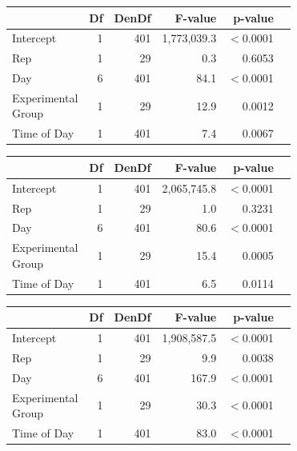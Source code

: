 \documentclass[a4paper, 10pt, titlepage]{article}
\begin{document}
\begin{table}[!htb]
\centering
{} 
\begin{tabular}{lrrrrr}
  \hline
 & Df & DenDf & F-value & p-value \\ 
  \hline
  Intercept & 1 & 401 & 1,773,039.3 & $<$0.0001\\
  Rep & 1 & 29 & 0.3 & 0.6053\\ 
  Day & 6 & 401 & 84.1 & $<$0.0001\\
  \makecell{Experimental \\ Group} & 1 & 29 & 12.9 & 0.0012\\
  Time of Day & 1 & 401 & 7.4 & 0.0067\\
   \hline
\end{tabular}
\end{table}

\begin{table}[!htb]
\centering
{} 
\begin{tabular}{lrrrrr}
  \hline
 & Df & DenDf & F-value & p-value \\ 
  \hline
  Intercept & 1 & 401 & 2,065,745.8 & $<$0.0001\\
  Rep & 1 & 29 & 1.0 & 0.3231\\ 
  Day & 6 & 401 & 80.6 & $<$0.0001\\
  \makecell{Experimental \\ Group} & 1 & 29 & 15.4 & 0.0005\\
  Time of Day & 1 & 401 & 6.5 & 0.0114\\
   \hline
\end{tabular}
\end{table}

\begin{table}[!htb]
\centering
{} 
\begin{tabular}{lrrrrr}
  \hline
 & Df & DenDf & F-value & p-value \\ 
  \hline
  Intercept & 1 & 401 & 1,908,587.5 & $<$0.0001\\
  Rep & 1 & 29 & 9.9 & 0.0038\\ 
  Day & 6 & 401 & 167.9 & $<$0.0001\\
  \makecell{Experimental \\ Group} & 1 & 29 & 30.3 & $<$0.0001\\
  Time of Day & 1 & 401 & 83.0 & $<$0.0001\\
   \hline
\end{tabular}
\end{table}
\end{document}

